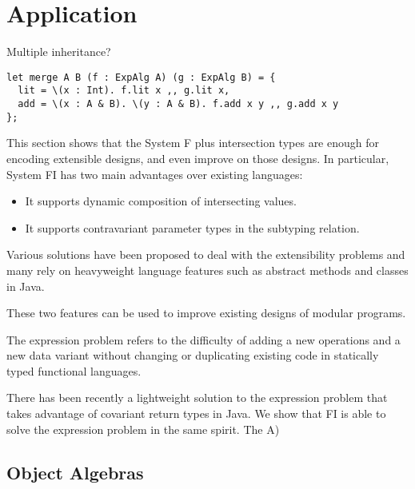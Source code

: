 \documentclass[preprint]{sigplanconf}
\begin{document}
\section{Application}

Multiple inheritance?



\begin{verbatim}
let merge A B (f : ExpAlg A) (g : ExpAlg B) = {
  lit = \(x : Int). f.lit x ,, g.lit x,
  add = \(x : A & B). \(y : A & B). f.add x y ,, g.add x y
};
\end{verbatim}

This section shows that the System F plus intersection types are enough for
encoding extensible designs, and even improve on those designs. In particular,
System FI has two main advantages over existing languages:

\begin{itemize}
\item It supports dynamic composition of intersecting values.
\item It supports contravariant parameter types in the subtyping relation.
\end{itemize}

Various solutions have been proposed to deal with the extensibility problems and
many rely on heavyweight language features such as abstract methods and classes
in Java.

These two features can be used to improve existing designs of modular programs.


The expression problem refers to the difficulty of adding a new operations and a
new data variant without changing or duplicating existing code in statically
typed functional languages.

There has been recently a lightweight solution to the expression problem that
takes advantage of covariant return types in Java. We show that FI is able to
solve the expression problem in the same spirit. The
A)

\subsection{Object Algebras}
\end{document}
